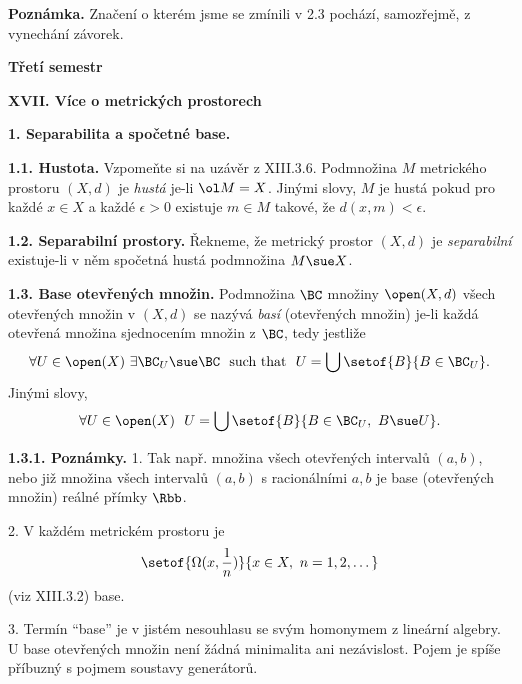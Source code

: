 \documentclass[12pt]{article}
\begin{document}
 \medskip
 
 {\bf Poznámka.} Značení o kterém jsme se zmínili v 2.3 pochází, samozřejmě, z vynechání
závorek.
 

 
\newpage

 
 \centerline{\huge\bf Třetí semestr} 
 
 \vskip10mm
 
 \centerline{\Large\bf XVII. Více o  metrických prostorech} 
 
 \vskip10mm
 
 
 \def\d{\text{\rm d}}
 
 \def\sint{\text{(II)}\!\!\!\int}    \def\fint{\text{(I)}\int}
 
 
 
 {\large\bf 1. Separabilita a spočetné base.}
 
  \medskip
	
 {\bf 1.1. Hustota.} Vzpomeňte si na uzávěr z XIII.3.6.  Podmnožina $M$ metrického prostoru $(X,d)$ je  {\em hustá} je-li $\ol M=X$. Jinými slovy, $M$ je hustá pokud pro každé $x\in X$ a každé $\epsilon>0$ existuje $m\in M$ takové, že $d(x,m)<\epsilon$.
 
 \bigskip
 
 {\bf 1.2. Separabilní prostory.} Řekneme, že metrický prostor $(X,d)$ je {\em separabilní} existuje-li v něm spočetná hustá podmnožina $M\sue X$.
 
 \bigskip
 
 {\bf 1.3. Base otevřených množin.} Podmnožina $\BC$ množiny $\open(X,d)$ všech otevřených množin v $(X,d)$ se nazývá {\em basí} (otevřených množin) je-li každá otevřená množina sjednocením množin z $\BC$, tedy jestliže
 $$
 \forall U\in\open(X)\ \exists \BC_U\sue\BC \ \ \text{such that}\ \ U=\bigcup\setof{B}{B\in\BC_U}.
 $$
 Jinými slovy,
 $$
 \forall U\in\open(X)\ \ U=\bigcup\setof{B}{B\in\BC_U, \ B\sue U}.
 $$
 
 \medskip
 
 {\bf 1.3.1. Poznámky.}
 1. Tak např. množina všech otevřených intervalů $(a,b)$, nebo již množina všech intervalů $(a,b)$ s racionálními $a,b$ je base (otevřených množin) reálné přímky $\Rbb$.
 
 2. V každém metrickém prostoru je
 $$
 \setof{\Omega(x,\frac1n)}{x\in X,\ n=1,2,\dots}
 $$
 (viz XIII.3.2) base.
 
 3. Termín ``base'' je v jistém nesouhlasu se svým homonymem z lineární algebry. U base otevřených množin není žádná minimalita ani nezávislost. Pojem je spíše příbuzný s pojmem soustavy generátorů.
 
\end{document}
